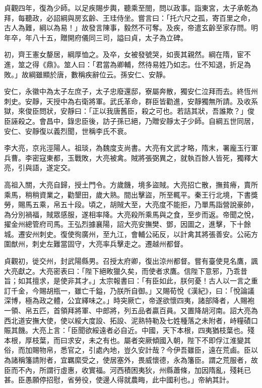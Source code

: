 \begin{pinyinscope}
 貞觀四年，復為少師。以足疾賜步輿，聽乘至閤，問以政事。詣東宮，太子承乾為拜，每聽政，必詔綱與房玄齡、王珪侍坐。嘗言曰：「托六尺之孤，寄百里之命，古人為難，綱以為易！」故發言陳事，毅然不可奪。及疾，帝遣玄齡至家存問。明年卒，年八十五，贈開府儀同三司，謚曰貞，太子為立碑。



 初，齊王憲女嫠居，綱厚恤之。及卒，女被發號哭，如喪其親然。綱在隋，宦不進，筮之得《鼎》。筮人曰：「君當為卿輔，然待易姓乃如志。仕不知退，折足為敗。」故綱雖顯於唐，數稱疾辭位云。孫安仁、安靜。



 安仁，永徽中為太子左庶子，太子忠廢還邸，寮屬奔散，獨安仁泣拜而去。終恆州刺史。安靜，天授中為右衛將軍。武氏革命，群臣皆勸進，安靜獨無所請。及收系獄，來俊臣問狀，安靜曰：「正以我唐舊臣，殺之可也。若詰其狀，吾誰欺？」俊臣誣殺之。會昌中，錄忠臣後，訪子孫已絕，乃贈安靜太子少師。自綱五世同居，安仁、安靜復以義烈聞，世稱李氏不衰。



 李大亮，京兆涇陽人。祖琰，為魏度支尚書。大亮有文武才略，隋末，署龐玉行軍兵曹。李密寇東都，玉戰敗，大亮被禽。賊將張弼異之，就執百餘人皆死，獨釋大亮，引與語，遂定交。



 高祖入關，大亮自歸，授土門令。方歲饑，境多盜賊。大亮招亡散，撫貧瘠，賣所乘馬，稍稍資業之，勸墾田，歲大熟。間出擊盜，所至輒平。秦王行北境，下書獎勞，賜馬五乘，帛五十段。頃之，胡賊大至，大亮度不能拒，乃單馬詣營說豪帥，為分別禍福，賊眾感服，遂相率降。大亮殺所乘馬與之食，至步而返。帝聞之悅，擢金州總管府司馬。王弘烈據襄陽，詔大亮安撫樊、鄧，因圖之，進擊，下十餘城。遷安州刺史。復使徇廣州，至九江，會輔公祏反，以計禽其將張善安。公祏方圍猷州，刺史左難當固守，大亮率兵擊走之。遷越州都督。



 貞觀初，徙交州，封武陽縣男。召授太府卿，復出涼州都督。嘗有臺使見名鷹，諷大亮獻之。大亮密表曰：「陛下絕畋獵久矣，而使者求鷹。信陛下意邪，乃乖昔旨；如其擅求，是使非其才。」太宗報書曰：「有臣如此，朕何憂！古人以一言之重訂千金，今賜胡瓶一，雖亡千鎰，乃朕所自御。」又賜荀悅《漢紀》，曰：「悅論議深博，極為政之體，公宜繹味之。」時突厥亡，帝遂欲懷四夷，諸部降者，人賜袍一領、帛五匹，首領拜將軍、中郎將，列五品者贏百員。又置降胡河南。詔大亮為西北道安撫大使，使以綏大度設、拓設、泥熟特勒及七姓種落之未附者，峙糧磧口賑其饑。大亮上言：「臣聞欲綏遠者必自近。中國，天下本根，四夷猶枝葉也。殘本根，厚枝葉，而曰求安，未之有也。屬者突厥傾國入朝，陛下不即俘江淮變其俗，而加賜物帛，悉官之，引處內地，豈久安計哉？今伊吾雖臣，遠在荒鹵。臣以為諸稱籓請附者，宜羈縻受之，使居塞外，畏威懷德，永為籓臣。謂之荒服者，故臣而不內，所謂行虛惠，收實福。河西積困夷狄，州縣蕭條，加因隋亂，殘耗已甚。臣愚願停招慰，省勞役，使邊人得就農畮，此中國利也。」帝納其計。




\end{pinyinscope}
